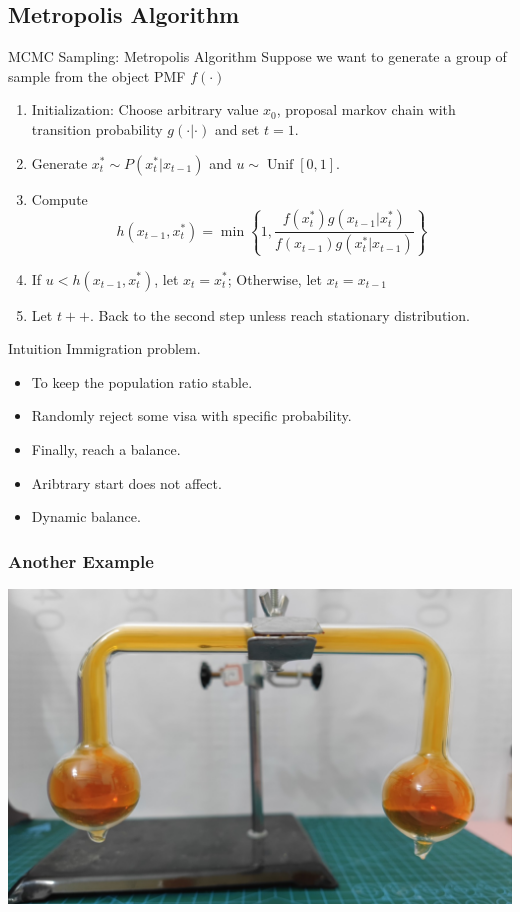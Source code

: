 \subsection{Metropolis Algorithm}
\begin{frame}{MCMC Sampling: Metropolis Algorithm}
    Suppose we want to generate a group of sample from the object PMF \(f(\cdot)\)
\begin{enumerate}
    \item Initialization: Choose arbitrary value \(x_0\), proposal markov chain with transition probability \(g(\cdot|\cdot)\) and set \(t = 1\).
    \item Generate \(x^*_t \sim P(x^*_t | x_{t-1})\) and \(u \sim \operatorname{Unif}[0,1]\).
    \item Compute \[h(x_{t-1},x^*_t) = \min\left\{1,\frac{f(x^*_t)g(x_{t-1}| x_t^*)}{f(x_{t-1})g(x^*_t | x_{t-1})}\right\}\]
    \item If \(u < h(x_{t-1},x^*_t)\), let \(x_{t} = x_t^*\); Otherwise, let \(x_t = x_{t-1}\)
    \item Let \(t++\). Back to the second step unless reach stationary distribution.
\end{enumerate}
\end{frame}


\begin{frame}{Intuition}
    Immigration problem.
    \begin{itemize}
        \item To keep the population ratio stable.
        \item Randomly reject some visa with specific probability.
        \item Finally, reach a balance.
        \item Aribtrary start does not affect.
        \item Dynamic balance.
    \end{itemize}
\end{frame}

\begin{frame}
    \frametitle{Another Example}
    \centering
    \includegraphics[width = .78\linewidth]{image3.png}

    

\end{frame}

